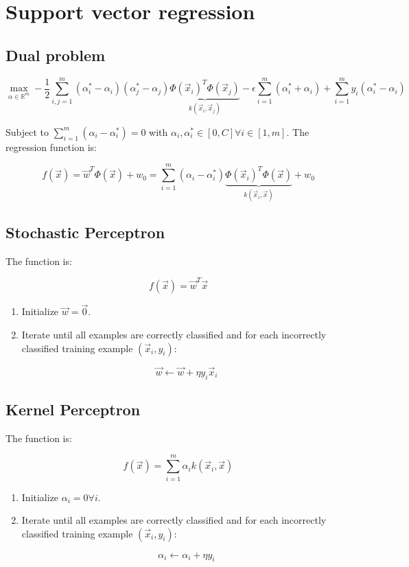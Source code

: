 \section{Support vector regression}

	\subsection{Dual problem}
	$$\max\limits_{\alpha\in\mathbb{R}^m}-\frac{1}{2}\sum\limits_{i,j=1}^m(\alpha_i^*-\alpha_i)(\alpha_j^*-\alpha_j)\underbrace{\Phi(\vec{x}_i)^T\Phi(\vec{x}_j)}_{k(\vec{x}_i,\vec{x}_j)}-\epsilon\sum\limits_{i=1}^m(\alpha_i^*+\alpha_i)+\sum\limits_{i=1}^my_i(\alpha_i^*-\alpha_i)$$

	Subject to $\sum\limits_{i=1}^m(\alpha_i-\alpha_i^*) = 0$ with $\alpha_i,\alpha_i^*\in[0,C]\forall i\in [1,m]$.
	The regression function is:

	$$f(\vec{x}) = \vec{w}^T\Phi(\vec{x}) + w_0 = \sum\limits_{i=1}^m(\alpha_i-\alpha_i^*)\underbrace{\Phi(\vec{x}_i)^T\Phi(\vec{x})}_{k(\vec{x}_i,\vec{x})}+w_0$$

	\subsection{Stochastic Perceptron}
	The function is:

	$$f(\vec{x}) = \vec{w}^T\vec{x}$$

	\begin{enumerate}
		\item Initialize $\vec{w} = \vec{0}$.
		\item Iterate until all examples are correctly classified and for each incorrectly classified training example $(\vec{x}_i,y_i)$:

			$$\vec{w}\leftarrow\vec{w}+\eta y_i\vec{x}_i$$
	\end{enumerate}

	\subsection{Kernel Perceptron}
	The function is:

	$$f(\vec{x}) = \sum\limits_{i=1}^m\alpha_ik(\vec{x}_i,\vec{x})$$

	\begin{enumerate}
		\item Initialize $\alpha_i= 0\forall i$.
		\item Iterate until all examples are correctly classified and for each incorrectly classified training example $(\vec{x}_i,y_i)$:

			$$\alpha_i\leftarrow\alpha_i+\eta y_i$$
	\end{enumerate}

